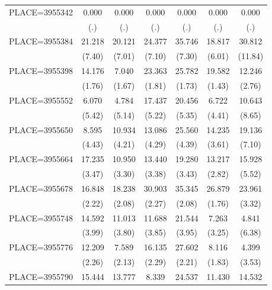 {\begin{tabular}{l*{6}{c}}
PLACE=3955342       &       0.000&       0.000&       0.000&       0.000&       0.000&       0.000\\
                    &         (.)&         (.)&         (.)&         (.)&         (.)&         (.)\\
PLACE=3955384       &      21.218&      20.121&      24.377&      35.746&      18.817&      30.812\\
                    &      (7.40)&      (7.01)&      (7.10)&      (7.30)&      (6.01)&     (11.84)\\
PLACE=3955398       &      14.176&       7.040&      23.363&      25.782&      19.582&      12.246\\
                    &      (1.76)&      (1.67)&      (1.81)&      (1.73)&      (1.43)&      (2.76)\\
PLACE=3955552       &       6.070&       4.784&      17.437&      20.456&       6.722&      10.643\\
                    &      (5.42)&      (5.14)&      (5.22)&      (5.35)&      (4.41)&      (8.65)\\
PLACE=3955650       &       8.595&      10.934&      13.086&      25.560&      14.235&      19.136\\
                    &      (4.43)&      (4.21)&      (4.29)&      (4.39)&      (3.61)&      (7.10)\\
PLACE=3955664       &      17.235&      10.950&      13.440&      19.280&      13.217&      15.928\\
                    &      (3.47)&      (3.30)&      (3.38)&      (3.43)&      (2.82)&      (5.52)\\
PLACE=3955678       &      16.848&      18.238&      30.903&      35.345&      26.879&      23.961\\
                    &      (2.22)&      (2.08)&      (2.27)&      (2.08)&      (1.76)&      (3.32)\\
PLACE=3955748       &      14.592&      11.013&      11.688&      21.544&       7.263&       4.841\\
                    &      (3.99)&      (3.80)&      (3.85)&      (3.95)&      (3.25)&      (6.38)\\
PLACE=3955776       &      12.209&       7.589&      16.135&      27.602&       8.116&       4.399\\
                    &      (2.26)&      (2.13)&      (2.29)&      (2.21)&      (1.83)&      (3.53)\\
PLACE=3955790       &      15.444&      13.777&       8.339&      24.537&      11.430&      14.532\\

\end{tabular}}
